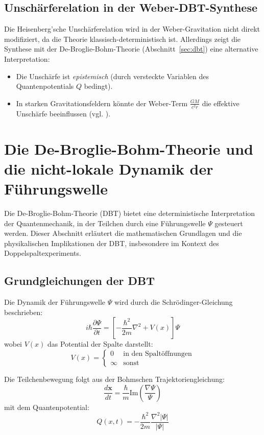 \subsection{Unschärferelation in der Weber-DBT-Synthese}
Die Heisenberg’sche Unschärferelation wird in der Weber-Gravitation nicht direkt modifiziert, da die Theorie klassisch-deterministisch ist. Allerdings zeigt die Synthese mit der
De-Broglie-Bohm-Theorie (Abschnitt~\ref{sec:dbt}) eine alternative Interpretation:
\begin{itemize}
    \item Die Unschärfe ist \textit{epistemisch} (durch versteckte Variablen des Quantenpotentials $Q$ bedingt).
    \item In starken Gravitationsfeldern könnte der Weber-Term $\frac{GM}{c^2 r}$ die effektive Unschärfe beeinflussen (vgl. \cite{bohm1952}).
\end{itemize}

\section{Die De-Broglie-Bohm-Theorie und die nicht-lokale Dynamik der Führungswelle}

Die De-Broglie-Bohm-Theorie (DBT) bietet eine deterministische Interpretation der Quantenmechanik, in der Teilchen durch eine Führungswelle $\Psi$ gesteuert werden. Dieser Abschnitt erläutert die mathematischen Grundlagen und die physikalischen Implikationen der DBT, insbesondere im Kontext des Doppelspaltexperiments.

\subsection{Grundgleichungen der DBT}

Die Dynamik der Führungswelle $\Psi$ wird durch die Schrödinger-Gleichung beschrieben:
\[ i\hbar\frac{\partial\Psi}{\partial t} = \left[-\frac{\hbar^2}{2m}\nabla^2 + V(x)\right]\Psi \]
wobei $V(x)$ das Potential der Spalte darstellt:
\[ V(x) = \begin{cases} 
0 & \text{in den Spaltöffnungen} \\
\infty & \text{sonst}
\end{cases} \]

Die Teilchenbewegung folgt aus der Bohmschen Trajektoriengleichung:
\[ \frac{d\mathbf{x}}{dt} = \frac{\hbar}{m}\text{Im}\left(\frac{\nabla\Psi}{\Psi}\right) \]
mit dem Quantenpotential:
\[ Q(x,t) = -\frac{\hbar^2}{2m}\frac{\nabla^2|\Psi|}{|\Psi|} \]

